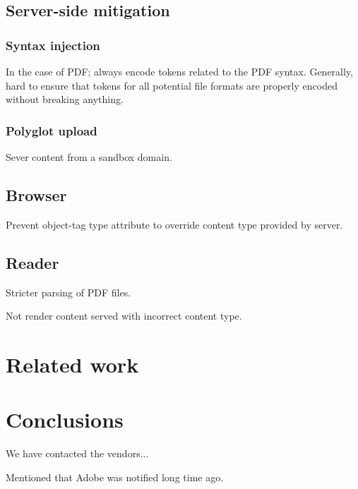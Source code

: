 \documentclass[10pt, conference, compsocconf]{IEEEtran}
\begin{document}
\subsection{Server-side mitigation}


\subsubsection{Syntax injection}

In the case of PDF; always encode tokens related to the PDF 
syntax. Generally, hard to ensure that tokens for all potential 
file formats are properly encoded without breaking anything.


\subsubsection{Polyglot upload}

Sever content from a sandbox domain.


\subsection{Browser}

Prevent object-tag type attribute to override content type 
provided by server. 


\subsection{Reader}

Stricter parsing of PDF files.

Not render content served with incorrect content type.








\section{Related work}







\section{Conclusions}


We have contacted the vendors...

Mentioned that Adobe was notified long time ago.







\end{document}
